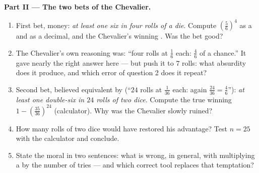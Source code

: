 \begin{problem}
\medskip
\noindent\textbf{Part II --- The two bets of the Chevalier.}
\begin{enumerate}[resume]
  \item First bet,  money: \emph{at least one six in four
        rolls of a die}. Compute
        $\left(\frac56\right)^4$ as a  and as a decimal,
        and the Chevalier's winning . Was the bet
        good?
  \item The Chevalier's own reasoning was: ``four rolls at
        $\frac16$ each: $\frac46$ of a chance.'' It gave nearly
        the right answer here --- but push it to $7$ rolls: what
        absurdity does it produce, and which error of question 2
        does it repeat?
  \item Second bet, believed equivalent by 
        (``$24$ rolls at $\frac1{36}$ each: again
        $\frac{24}{36} = \frac46$''): \emph{at least one
        double-six in $24$ rolls of two dice}. Compute the true
        winning  $1 - \left(\frac{35}{36}\right)^{24}$
        (calculator). Why was the Chevalier slowly ruined?
  \item How many rolls of two dice would have restored his
        advantage? Test $n = 25$ with the calculator and
        conclude.
  \item State the moral in two sentences: what is wrong, in
        general, with multiplying a  by the number of
        tries --- and which correct tool replaces that
        temptation?
\end{enumerate}


\end{problem}
